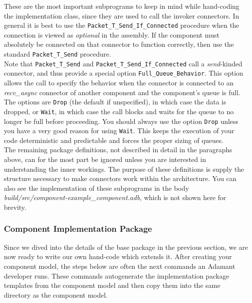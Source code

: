 These are the most important subprograms to keep in mind while hand-coding the implementation class, since they are used to call the invoker connectors. In general it is best to use the \texttt{Packet\_T\_Send\_If\_Connected} procedure when the connection is viewed as \textit{optional} in the assembly. If the component must absolutely be connected on that connector to function correctly, then use the standard \texttt{Packet\_T\_Send} procedure. \\

Note that \texttt{Packet\_T\_Send} and \texttt{Packet\_T\_Send\_If\_Connected} call a \textit{send}-kinded connector, and thus provide a special option \texttt{Full\_Queue\_Behavior}. This option allows the call to specify the behavior when the connector is connected to an \textit{recv\_async} connector of another component and the component's queue is full. The options are \texttt{Drop} (the default if unspecified), in which case the data is dropped, or \texttt{Wait}, in which case the call blocks and waits for the queue to no longer be full before proceeding. You should always use the option \texttt{Drop} unless you have a very good reason for using \texttt{Wait}. This keeps the execution of your code deterministic and predictable and forces the proper sizing of queues. \\

The remaining package definitions, not described in detail in the paragraphs above, can for the most part be ignored unless you are interested in understanding the inner workings. The purpose of these definitions is supply the structure necessary to make connectors work within the architecture. You can also see the implementation of these subprograms in the body \textit{build/src/component-example\_component.adb}, which is not shown here for brevity.

\subsubsection{Component Implementation Package} \label{Component Implementation Package}

Since we dived into the details of the base package in the previous section, we are now ready to write our own hand-code which extends it. After creating your component model, the steps below are often the next commands an Adamant developer runs. These commands autogenerate the implementation package templates from the component model and then copy them into the same directory as the component model.

